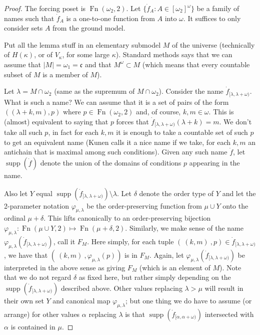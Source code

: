 \documentclass[11pt]{article}
\begin{document}
        \begin{proof}
        The forcing poset is $\operatorname{Fn}(\omega_2, 2)$.
        Let $\{ \dot f_{A} : A\in [\omega_2]^\omega\}$ be a family of
        names such that $\dot f_{A}$ is a one-to-one function from $A$ into
        $\omega$. It suffices to only consider sets $A$ from the ground
        model.
        \bigskip

        Put all the lemma  stuff in an elementary submodel $M$ of the universe
        (technically of $H(\kappa)$,  or of $V_\kappa$,
         for some large $\kappa$). Standard methods says that we can assume that
         $|M|=\omega_1 =\mathfrak c$ and that $M^\omega\subset M$ (which means
         that every countable subset of $M$ is a member of $M$).
        \bigskip

        Let $\lambda = M\cap \omega_2$ (same as the supremum of $M\cap
        \omega_2$). Consider the name  $\dot f_{[\lambda,\lambda+\omega)}$.
        What is such a name?  We can assume that it is a set of pairs
         of the form $( (\lambda+k,m), p)$ where $p\in \mathop{Fn}(\omega_2,
         2)$ and, of course, $k,m\in \omega$. This is (almost) equivalent to
         saying
         that $p$ forces that $\dot f_{[\lambda,\lambda+\omega)}(\lambda+k) =
         m$. We don't take all such $p$, in fact for each $k,m$ it is enough
        to take a
         countable set of such $p$ to get an equivalent name
         (Kunen calls it a nice name if we take, for each $k,m$ an
        antichain that is maximal among such conditions).
        Given any such name $\dot f$, let $\operatorname{supp}(\dot f)$
        denote the union of the domains of conditions $p$ appearing in the
        name.



         Also let $Y$ equal $\operatorname{supp}(\dot
         f_{[\lambda,\lambda+\omega)})\setminus \lambda$.
         Let $\delta$ denote the order type of
         $Y$ and let the 2-parameter notation
         $\varphi_{\mu,\lambda}$ be the order-preserving function from
        $\mu\cup Y$ onto  the ordinal $\mu+\delta$.  This lifts canonically to
        an order-preserving bijection $\varphi_{\mu,\lambda}:
        \operatorname{Fn}(\mu\cup Y,2) \mapsto
        \operatorname{Fn}(\mu+\delta,2)$.
        Similarly, we make sense of the name
         $\varphi_{\mu,\lambda}(\dot f_{[\lambda,\lambda+\omega)})$, call it $F_M$.
        Here simply, for each tuple $(~(k,m)~, p)\in \dot
        f_{[\lambda,\lambda+\omega)}$,
         we have that $(~(k,m)~,\varphi_{\mu,\lambda}(p))$ is in $F_M$.
        Again, let $\varphi_{\mu,\lambda}(\dot f_{[\lambda,\lambda+\omega)})$
        be interpreted in the above sense as giving $F_M$ (which is an element
        of $M$).  Note that we do not regard $\delta$ as fixed here, but
        rather simply depending on the $\operatorname{supp}(\dot
        f_{[\lambda,\lambda+\omega)})$ described above. Other values
        replacing $\lambda>\mu$ will result in their own set $Y$
        and canonical map $\varphi_{\mu,\lambda}$; but one thing we do have to
        assume (or arrange) for other values $\alpha$ replacing $\lambda$
        is that $\operatorname{supp}(\dot f_{[\alpha,\alpha+\omega)})$
        intersected with
        $\alpha$ is contained in $\mu$.


\end{proof}
\end{document}
